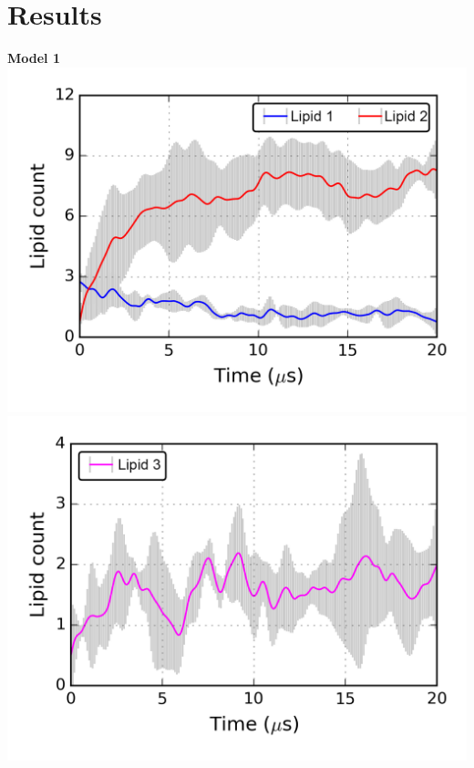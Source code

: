 \documentclass[a0,final,landscape]{a0poster}
\begin{document}


\vspace{-15.2cm}
\hspace{39cm}
\begin{minipage}[c][-30cm]{0.3\textwidth}
\section*{\textcolor{blue1}{\Huge \bf{Results}}} 
\vspace{-0.5cm}
\Large\textcolor{vino}{\textbf{Model 1}}\\
\includegraphics[scale=1.7]{img/Model1_Lipid12.png}
\includegraphics[scale=1.7]{img/Model2_Lipid3.png}\\ 

\end{minipage}
\end{document}
